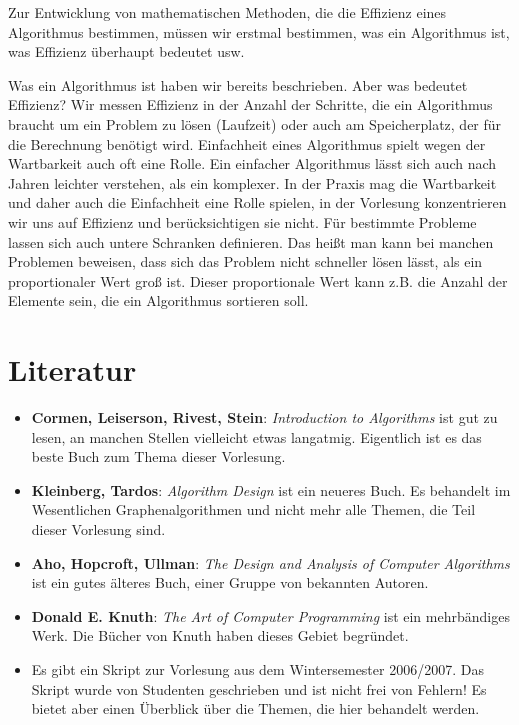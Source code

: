 Zur Entwicklung von mathematischen Methoden, die die Effizienz eines Algorithmus bestimmen, müssen wir erstmal bestimmen, was ein Algorithmus ist, was Effizienz überhaupt bedeutet usw.

Was ein Algorithmus ist haben wir bereits beschrieben. Aber was bedeutet Effizienz? Wir messen Effizienz in der Anzahl der Schritte, die ein Algorithmus braucht um ein Problem zu lösen (Laufzeit) oder auch am Speicherplatz, der für die Berechnung benötigt wird. Einfachheit eines Algorithmus spielt wegen der Wartbarkeit auch oft eine Rolle. Ein einfacher Algorithmus lässt sich auch nach Jahren leichter verstehen, als ein komplexer. In der Praxis mag die Wartbarkeit und daher auch die Einfachheit eine Rolle spielen, in der Vorlesung konzentrieren wir uns auf Effizienz und berücksichtigen sie nicht. Für bestimmte Probleme lassen sich auch untere Schranken definieren. Das heißt man kann bei manchen Problemen beweisen, dass sich das Problem nicht schneller lösen lässt, als ein proportionaler Wert groß ist. Dieser proportionale Wert kann z.B. die Anzahl der Elemente sein, die ein Algorithmus sortieren soll.

\section*{Literatur}
\begin{itemize}
\item \textbf{Cormen, Leiserson, Rivest, Stein}: \textit{Introduction to Algorithms} ist gut zu lesen, an manchen Stellen vielleicht etwas langatmig. Eigentlich ist es das beste Buch zum Thema dieser Vorlesung.
\item \textbf{Kleinberg, Tardos}: \textit{Algorithm Design} ist ein neueres Buch. Es behandelt im Wesentlichen Graphenalgorithmen und nicht mehr alle Themen, die Teil dieser Vorlesung sind.
\item \textbf{Aho, Hopcroft, Ullman}: \textit{The Design and Analysis of Computer Algorithms} ist ein gutes älteres Buch, einer Gruppe von bekannten Autoren.
\item \textbf{Donald E. Knuth}: \textit{The Art of Computer Programming} ist ein mehrbändiges Werk. Die Bücher von Knuth haben dieses Gebiet begründet.
\item Es gibt ein Skript zur Vorlesung aus dem Wintersemester 2006/2007. Das Skript wurde von Studenten geschrieben und ist nicht frei von Fehlern! Es bietet aber einen Überblick über die Themen, die hier behandelt werden.
\end{itemize}
